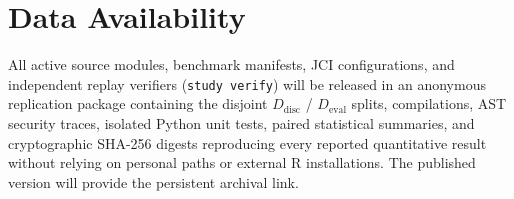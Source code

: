 \section{Data Availability}

All active source modules, benchmark manifests, JCI configurations, and
independent replay verifiers (\texttt{study verify}) will be released in an
anonymous replication package containing the disjoint $D_{\mathrm{disc}}$ /
$D_{\mathrm{eval}}$ splits, \prompttsg compilations, AST security traces,
isolated Python unit tests, paired statistical summaries, and cryptographic
SHA-256 digests reproducing every reported quantitative result without relying
on personal paths or external R installations. The published version will
provide the persistent archival link.
